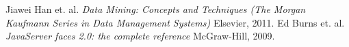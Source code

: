 \documentclass[oneside,numbers,spanish]{ezthesis}
\begin{document}








\tableofcontents




%
%

\begin{thebibliography}{1}
 Jiawei Han et. al. {\em Data Mining: Concepts and Techniques (The Morgan Kaufmann Series in Data Management Systems)} Elsevier, 2011.
 Ed Burns et. al. {\em JavaServer faces 2.0: the complete reference} McGraw-Hill, 2009.
  
\end{thebibliography}


\appendix
%
%
%

\end{document}
